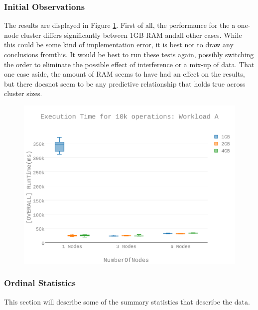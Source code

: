\subsubsection{Initial Observations}
The results are displayed in Figure \ref{figures-wle_fig4}.  First of all, the performance for the a one-node cluster differs significantly between 1GB RAM andall other cases.  While this could be some kind of implementation error, it is best not to draw any conclusions fromthis. It would be best to run these tests again, possibly switching the order to eliminate the possible effect of interference or a mix-up of data. That one case aside, the amount of RAM seems to have had an effect on the results, but there doesnot seem to be any predictive relationship that holds true across cluster sizes. \begin{figure}[h]
\includegraphics[width=5.5in]{Figures/figures-wle_fig4.pdf}
\caption{}
\label{figures-wle_fig4}
\end{figure}



\subsubsection{Ordinal Statistics}
This section will describe some of the summary statistics that describe the data.  

